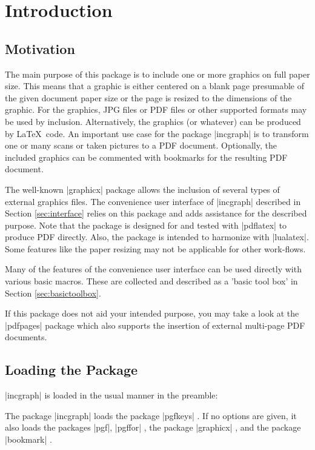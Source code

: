 \documentclass[a4paper,11pt]{ltxdoc}
\begin{document}
\section{Introduction}
\subsection{Motivation}
The main purpose of this package is to include one or more graphics on full
paper size. This means that a graphic is either centered on a blank page
presumable of the given document paper size or the page is resized
to the dimensions of the graphic.
For the graphics, JPG files or PDF files or other supported formats may be
used by inclusion. Alternatively, the graphics (or whatever) can be produced
by \LaTeX\ code.
An important use case for the package |incgraph| is to transform one or many scans
or taken pictures to a PDF document. Optionally, the included graphics can
be commented with bookmarks for the resulting PDF document.

The well-known |graphicx| package \cite{carlisle:graphics} allows the inclusion
of several types of external graphics files. The convenience user interface
of |incgraph| described in Section \ref{sec:interface} relies on this package and adds
assistance for the described purpose. Note that the package is designed for and
tested with |pdflatex| to produce PDF directly. Also, the package is
intended to harmonize with |lualatex|.
Some features like the paper
resizing may not be applicable for other work-flows.

Many of the features of the convenience user interface can be used directly
with various basic macros. These are collected and described
as a 'basic tool box' in Section \ref{sec:basictoolbox}.

If this package does not aid your intended purpose, you may take a look
at the |pdfpages| package \cite{matthias:pdfpages} which also supports the insertion of
external multi-page PDF documents.


\subsection{Loading the Package}
|incgraph| is loaded in the usual manner in the preamble:
\begin{dispListing}
\usepackage{incgraph}
\end{dispListing}

The package |incgraph| loads the package
|pgfkeys| \cite{tantau:tikz}. If no options are given, it also
loads the packages |pgf|, |pgffor| \cite{tantau:tikz},
the package |graphicx| \cite{carlisle:graphics}, and the
package |bookmark| \cite{oberdiek:bookmark}.
\end{document}
